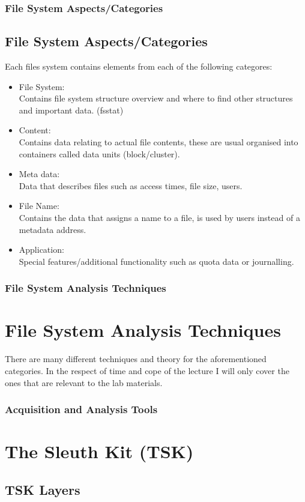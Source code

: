 \documentclass{beamer}
\begin{document}
\begin{frame}
	\frametitle{File System Aspects/Categories}
	\subsection{File System Aspects/Categories}
	Each files system contains elements from each of the following categores:
	\begin{itemize}
		\item File System: \\ Contains file system structure overview and where to find other structures and important data. (fsstat)
		\item Content: \\ Contains data relating to actual file contents, these are usual organised into containers called data units (block/cluster).
		\item Meta data: \\ Data that describes files such as access times, file size, users.
		\item File Name: \\ Contains the data that assigns a name to a file, is used by users instead of a metadata address.
		\item Application: \\ Special features/additional functionality such as quota data or journalling.	
	\end{itemize}	    
\end{frame}

\begin{frame}
	\frametitle{File System Analysis Techniques}
	\section{File System Analysis Techniques}
	There are many different techniques and theory for the aforementioned categories. In the respect of time and cope of the lecture I will only cover the ones that are relevant to the lab materials.
	
\end{frame}

\begin{frame}
	\frametitle{Acquisition and Analysis Tools}
	\section{The Sleuth Kit (TSK)}
		\subsection{TSK Layers}
\end{frame}
\end{document}
